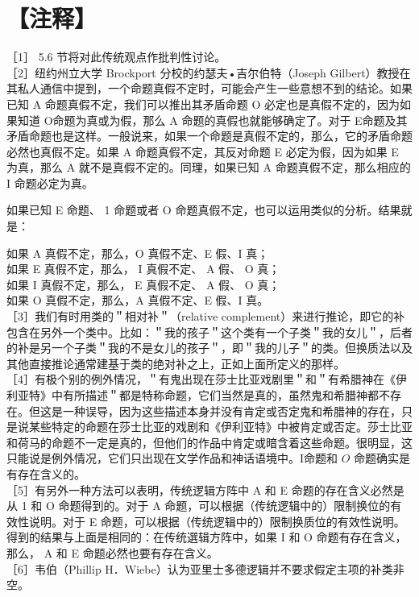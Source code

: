 \section*{【注释】}
［1］ 5.6 节将对此传统观点作批判性讨论。\\
［2］纽约州立大学 Brockport 分校的约瑟夫•吉尔伯特（Joseph Gilbert）教授在其私人通信中提到，一个命题真假不定时，可能会产生一些意想不到的结论。如果已知 A 命题真假不定，我们可以推出其矛盾命题 O 必定也是真假不定的，因为如果知道 O命题为真或为假，那么 A 命题的真假也就能够确定了。对于 E命题及其矛盾命题也是这样。一般说来，如果一个命题是真假不定的，那么，它的矛盾命题必然也真假不定。如果 A 命题真假不定，其反对命题 E 必定为假，因为如果 E 为真，那么 A 就不是真假不定的。同理，如果已知 A 命题真假不定，那么相应的 I 命题必定为真。

如果已知 E 命题、 1 命题或者 O 命题真假不定，也可以运用类似的分析。结果就是：

如果 A 真假不定，那么，O 真假不定、E 假、I 真；\\
如果 E 真假不定，那么， I 真假不定、 A 假、 O 真；\\
如果 I 真假不定，那么， E 真假不定、 A 假、 O 真；\\
如果 O 真假不定，那么，A 真假不定、E 假、I 真。\\
［3］我们有时用类的＂相对补＂（relative complement）来进行推论，即它的补包含在另外一个类中。比如：＂我的孩子＂这个类有一个子类＂我的女儿＂，后者的补是另一个子类＂我的不是女儿的孩子＂，即＂我的儿子＂的类。但换质法以及其他直接推论通常建基于类的绝对补之上，正如上面所定义的那样。\\
［4］有极个别的例外情况，＂有鬼出现在莎士比亚戏剧里＂和＂有希腊神在《伊利亚特》中有所描述＂都是特称命题，它们当然是真的，虽然鬼和希腊神都不存在。但这是一种误导，因为这些描述本身并没有肯定或否定鬼和希腊神的存在，只是说某些特定的命题在莎士比亚的戏剧和《伊利亚特》中被肯定或否定。莎士比亚和荷马的命题不一定是真的，但他们的作品中肯定或暗含着这些命题。很明显，这只能说是例外情况，它们只出现在文学作品和神话语境中。I命题和 $O$ 命题确实是有存在含义的。\\
［5］有另外一种方法可以表明，传统逻辑方阵中 A 和 E 命题的存在含义必然是从 1 和 O 命题得到的。对于 A 命题，可以根据（传统逻辑中的）限制换位的有效性说明。对于 E 命题，可以根据（传统逻辑中的）限制换质位的有效性说明。得到的结果与上面是相同的：在传统選辑方阵中，如果 I 和 O 命题有存在含义，那么， A 和 E 命题必然也要有存在含义。\\
［6］韦伯（Phillip H．Wiebe）认为亚里士多德逻辑并不要求假定主项的补类非空。

